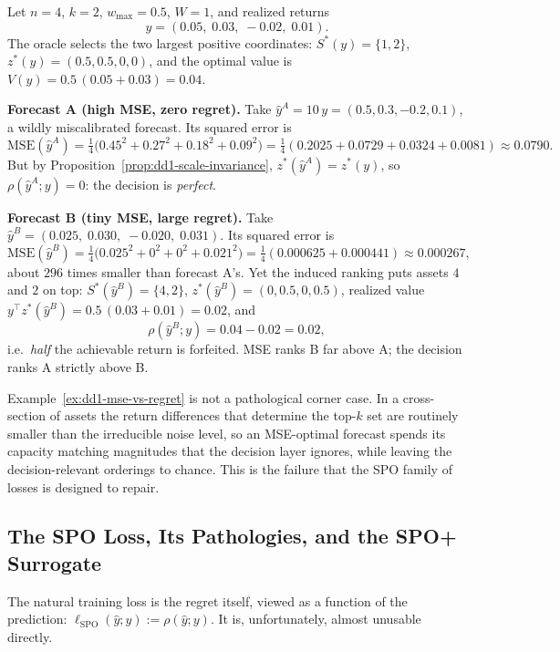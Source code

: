 \begin{example}
\label{ex:dd1-mse-vs-regret}
Let $n = 4$, $k = 2$, $w_{\max} = 0.5$, $W = 1$, and realized returns
\[
y = (0.05,\; 0.03,\; -0.02,\; 0.01).
\]
The oracle selects the two largest positive coordinates: $S^*(y) = \{1, 2\}$,
$z^*(y) = (0.5, 0.5, 0, 0)$, and the optimal value is
$V(y) = 0.5\,(0.05 + 0.03) = 0.04$.

\textbf{Forecast A (high MSE, zero regret).} Take $\hat{y}^A = 10\,y =
(0.5, 0.3, -0.2, 0.1)$, a wildly miscalibrated forecast. Its squared error is
\[
\mathrm{MSE}(\hat{y}^A)
= \tfrac{1}{4}\bigl(0.45^2 + 0.27^2 + 0.18^2 + 0.09^2\bigr)
= \tfrac{1}{4}(0.2025 + 0.0729 + 0.0324 + 0.0081)
\approx 0.0790 .
\]
But by Proposition~\ref{prop:dd1-scale-invariance},
$z^*(\hat{y}^A) = z^*(y)$, so $\rho(\hat{y}^A; y) = 0$: the decision is
\emph{perfect}.

\textbf{Forecast B (tiny MSE, large regret).} Take
$\hat{y}^B = (0.025,\; 0.030,\; -0.020,\; 0.031)$. Its squared error is
\[
\mathrm{MSE}(\hat{y}^B)
= \tfrac{1}{4}\bigl(0.025^2 + 0^2 + 0^2 + 0.021^2\bigr)
= \tfrac{1}{4}(0.000625 + 0.000441)
\approx 0.000267,
\]
about $296$ times smaller than forecast A's. Yet the induced ranking puts
assets $4$ and $2$ on top: $S^*(\hat{y}^B) = \{4, 2\}$,
$z^*(\hat{y}^B) = (0, 0.5, 0, 0.5)$, realized value
$y^\top z^*(\hat{y}^B) = 0.5\,(0.03 + 0.01) = 0.02$, and
\[
\rho(\hat{y}^B; y) = 0.04 - 0.02 = 0.02,
\]
i.e.\ \emph{half} the achievable return is forfeited. MSE ranks B far above
A; the decision ranks A strictly above B.
\end{example}

\begin{warning}
Example~\ref{ex:dd1-mse-vs-regret} is not a pathological corner case. In a
cross-section of assets the return differences that determine the top-$k$ set
are routinely smaller than the irreducible noise level, so an MSE-optimal
forecast spends its capacity matching magnitudes that the decision layer
ignores, while leaving the decision-relevant orderings to chance. This is the
failure that the SPO family of losses is designed to repair.
\end{warning}

\subsection{The SPO Loss, Its Pathologies, and the SPO+ Surrogate}
\label{sec:dd1-spoplus}

The natural training loss is the regret itself, viewed as a function of the
prediction: $\ell_{\mathrm{SPO}}(\hat{y}; y) := \rho(\hat{y}; y)$. It is,
unfortunately, almost unusable directly.

